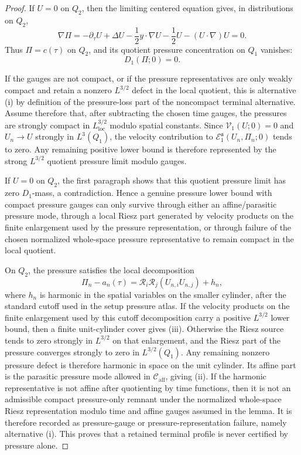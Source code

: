 \documentclass[11pt]{amsart}
\numberwithin{equation}{section}
\theoremstyle{plain}
\theoremstyle{definition}
\theoremstyle{remark}
\newcommand{\loc}{\mathrm{loc}}
\newcommand{\calE}{\mathcal E}
\newcommand{\Vel}{\mathcal V}
\newcommand{\Caff}{\mathcal C_{\mathrm{aff}}}
\begin{document}
\begin{proof}
If \(U=0\) on \(Q_2\), then the limiting centered equation gives, in
distributions on \(Q_2\),
\[
   \nabla\Pi
   =
   -\partial_\tau U+\Delta U-\frac12y\cdot\nabla U-\frac12U
   -(U\cdot\nabla)U
   =0 .
\]
Thus \(\Pi=c(\tau)\) on \(Q_2\), and its quotient pressure concentration on
\(Q_1\) vanishes:
\[
   D_1(\Pi;0)=0 .
\]

If the gauges are not compact, or if the pressure representatives are only
weakly compact and retain a nonzero \(L^{3/2}\) defect in the local quotient,
this is alternative \textup{(i)} by definition of the pressure-loss part of the
noncompact terminal alternative.  Assume therefore that, after subtracting the
chosen time gauges, the pressures are strongly compact in
\(L^{3/2}_{\loc}\) modulo spatial constants.  Since
\(\Vel_1(U;0)=0\) and \(U_n\to U\) strongly in \(L^3(Q_1)\), the velocity
contribution to \(\calE_1^{\mathfrak a}(U_n,\Pi_n;0)\) tends to zero.  Any
remaining positive lower bound is therefore represented by the strong
\(L^{3/2}\) quotient pressure limit modulo gauges.

If \(U=0\) on \(Q_2\), the first paragraph shows that this quotient pressure
limit has zero \(D_1\)-mass, a contradiction.  Hence a genuine pressure lower
bound with compact pressure gauges can only survive through either an
affine/parasitic pressure mode, through a local Riesz part generated by
velocity products on the finite enlargement used by the pressure
representation, or through failure of the chosen normalized whole-space
pressure representative to remain compact in the local quotient.

On \(Q_2\), the pressure satisfies the local decomposition
\[
   \Pi_n-a_n(\tau)
   =
   \mathcal R_i\mathcal R_j(U_{n,i}U_{n,j})+h_n,
\]
where \(h_n\) is harmonic in the spatial variables on the smaller cylinder,
after the standard cutoff used in the setup pressure atlas.  If the velocity
products on the finite enlargement used by this cutoff decomposition carry a
positive \(L^{3/2}\) lower bound, then a finite unit-cylinder cover gives
\textup{(iii)}.  Otherwise the Riesz source tends to zero strongly in
\(L^{3/2}\) on that enlargement, and the Riesz part of the pressure converges
strongly to zero in \(L^{3/2}(Q_1)\).  Any remaining nonzero pressure defect is
therefore harmonic in space on the unit cylinder.  Its affine part is
the parasitic pressure mode allowed in \(\Caff\), giving \textup{(ii)}.  If the
harmonic representative is not affine after quotienting by time functions,
then it is not an admissible compact pressure-only remnant under the normalized
whole-space Riesz representation modulo time and affine gauges assumed in the
lemma.  It is therefore recorded as pressure-gauge or pressure-representation
failure, namely alternative \textup{(i)}.  This proves that a retained terminal
profile is never certified by pressure alone.
\end{proof}
\end{document}
